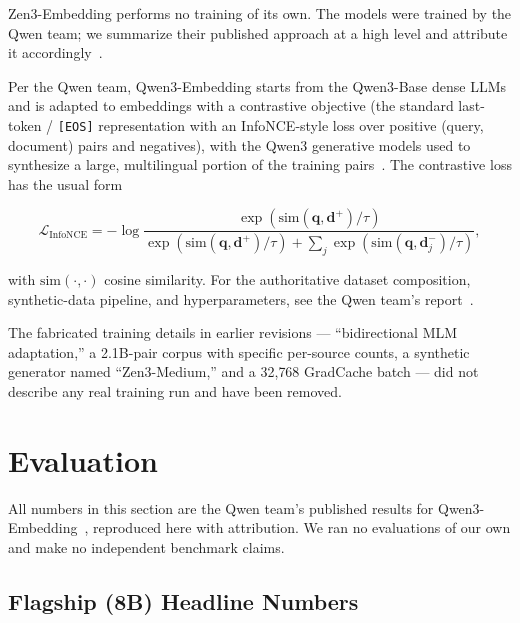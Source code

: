 \documentclass[11pt,a4paper]{article}
\begin{document}
Zen3-Embedding performs no training of its own. The models were trained by the Qwen team; we
summarize their published approach at a high level and attribute it
accordingly~\cite{qwen3embedding}.

Per the Qwen team, Qwen3-Embedding starts from the Qwen3-Base dense LLMs and is adapted to
embeddings with a contrastive objective (the standard last-token / \texttt{[EOS]}
representation with an InfoNCE-style loss over positive (query, document) pairs and
negatives), with the Qwen3 generative models used to synthesize a large, multilingual portion
of the training pairs~\cite{qwen3embedding}. The contrastive loss has the usual form

\begin{equation}
\mathcal{L}_{\text{InfoNCE}} = -\log \frac{\exp(\text{sim}(\mathbf{q}, \mathbf{d}^+) / \tau)}{\exp(\text{sim}(\mathbf{q}, \mathbf{d}^+) / \tau) + \sum_{j} \exp(\text{sim}(\mathbf{q}, \mathbf{d}^-_j) / \tau)},
\end{equation}

with $\text{sim}(\cdot,\cdot)$ cosine similarity. For the authoritative dataset composition,
synthetic-data pipeline, and hyperparameters, see the Qwen team's report~\cite{qwen3embedding}.

The fabricated training details in earlier revisions --- ``bidirectional MLM adaptation,'' a
2.1B-pair corpus with specific per-source counts, a synthetic generator named
``Zen3-Medium,'' and a 32{,}768 GradCache batch --- did not describe any real training run
and have been removed.

\section{Evaluation}
\label{sec:eval}

All numbers in this section are the Qwen team's published results for
Qwen3-Embedding~\cite{qwen3embedding}, reproduced here with attribution. We ran no evaluations
of our own and make no independent benchmark claims.

\subsection{Flagship (8B) Headline Numbers}
\end{document}
